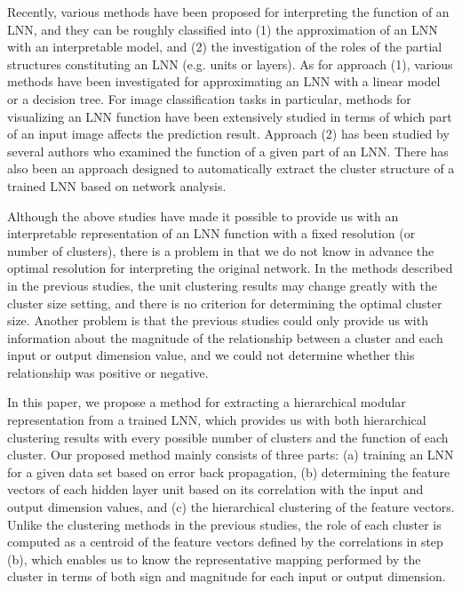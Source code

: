 \documentclass{article}
\begin{document}
Recently, various methods have been proposed for interpreting the function of an LNN, and they can be roughly classified into (1) the approximation of an LNN with an interpretable model, and (2) the investigation of the roles of the partial structures constituting an LNN (e.g. units or layers). 
As for approach (1), various methods have been investigated for approximating an LNN with a linear model\cite{Lundberg2017,Nagamine2017,Ribeiro2016} or a decision tree\cite{Craven1996,Johansson2009,Krishnan1999,Thiagarajan2016}. 
For image classification tasks in particular, methods for visualizing an LNN function have been extensively studied in terms of which part of an input image affects the prediction result\cite{Ancona2018,Bach2015,Shrikumar2017,Simonyan2014,Smilkov2017,Springenberg2015,Sundararajan2017}. 
Approach (2) has been studied by several authors who examined the function of a given part of an LNN\cite{Alain2017,Luo2016,Raghu2017,Zahavy2016}. There has also been an approach designed to automatically extract the cluster structure of a trained LNN\cite{Watanabe2017d,Watanabe2017b,Watanabe2018} based on network analysis. 

Although the above studies have made it possible to provide us with an interpretable representation of an LNN function with a fixed resolution (or number of clusters), there is a problem in that we do not know in advance the optimal resolution for interpreting the original network. In the methods described in the previous studies\cite{Watanabe2017b,Watanabe2017d,Watanabe2018,Watanabe2018arxiv,Watanabe2018arxiv2}, the unit clustering results may change greatly with the cluster size setting, and there is no criterion for determining the optimal cluster size. 
Another problem is that the previous studies could only provide us with information about the magnitude of the relationship between a cluster and each input or output dimension value, and we could not determine whether this relationship was positive or negative. 

In this paper, we propose a method for extracting a hierarchical modular representation from a trained LNN, which provides us with both hierarchical clustering results with every possible number of clusters and the function of each cluster. Our proposed method mainly consists of three parts: (a) training an LNN for a given data set based on error back propagation, (b) determining the feature vectors of each hidden layer unit based on its correlation with the input and output dimension values, and (c) the hierarchical clustering of the feature vectors. Unlike the clustering methods in the previous studies, the role of each cluster is computed as a centroid of the feature vectors defined by the correlations in step (b), which enables us to know the representative mapping performed by the cluster in terms of both sign and magnitude for each input or output dimension. 
\end{document}
